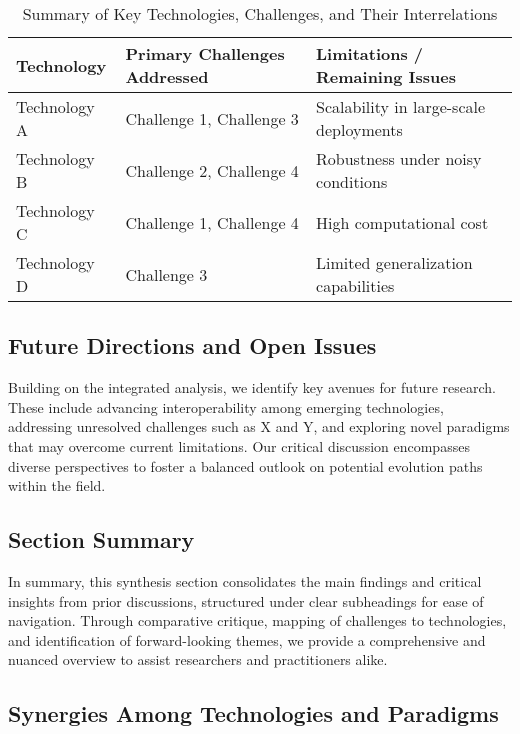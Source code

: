 \documentclass[sigconf]{acmart}
\begin{document}
\begin{table*}[htbp]
\centering
\caption{Summary of Key Technologies, Challenges, and Their Interrelations}
\label{tab:challenge_technology_summary}
\begin{adjustbox}{max width=\textwidth}
\begin{tabular}{@{}lll@{}}
\toprule
\textbf{Technology} & \textbf{Primary Challenges Addressed} & \textbf{Limitations / Remaining Issues} \\ \midrule
Technology A & Challenge 1, Challenge 3 & Scalability in large-scale deployments \\
Technology B & Challenge 2, Challenge 4 & Robustness under noisy conditions \\
Technology C & Challenge 1, Challenge 4 & High computational cost \\
Technology D & Challenge 3 & Limited generalization capabilities \\ \bottomrule
\end{tabular}
\end{adjustbox}
\end{table*}

\subsection{Future Directions and Open Issues}
Building on the integrated analysis, we identify key avenues for future research. These include advancing interoperability among emerging technologies, addressing unresolved challenges such as X and Y, and exploring novel paradigms that may overcome current limitations. Our critical discussion encompasses diverse perspectives to foster a balanced outlook on potential evolution paths within the field.

\subsection{Section Summary}
In summary, this synthesis section consolidates the main findings and critical insights from prior discussions, structured under clear subheadings for ease of navigation. Through comparative critique, mapping of challenges to technologies, and identification of forward-looking themes, we provide a comprehensive and nuanced overview to assist researchers and practitioners alike.

\subsection{Synergies Among Technologies and Paradigms}
\end{document}
